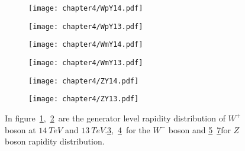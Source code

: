 \documentclass[a4paper,12pt]{report}
\numberwithin{equation}{section}
\begin{document}
\begin{figure}[H]
\centering
\begin{subfigure}{0.49\textwidth}
\texttt{[image: chapter4/WpY14.pdf]}
\vspace*{-8mm}
\caption{}
\label{wpy14}
\end{subfigure}
\begin{subfigure}{0.49\textwidth}
\texttt{[image: chapter4/WpY13.pdf]}
\vspace*{-8mm}
\caption{}
\label{wpy13}
\end{subfigure}
\begin{subfigure}{0.49\textwidth}
\texttt{[image: chapter4/WmY14.pdf]}
\vspace*{-8mm}
\caption{}
\label{wmy14}
\end{subfigure}
\begin{subfigure}{0.49\textwidth}
\texttt{[image: chapter4/WmY13.pdf]}
\vspace*{-8mm}
\caption{}
\label{wmy13}
\end{subfigure}
\begin{subfigure}{0.49\textwidth}
\texttt{[image: chapter4/ZY14.pdf]}
\vspace*{-8mm}
\caption{}
\label{zy14}
\end{subfigure}
\begin{subfigure}{0.49\textwidth}
\texttt{[image: chapter4/ZY13.pdf]}
\vspace*{-8mm}
\caption{}
\label{zy13}
\end{subfigure}
\caption{In figure~\ref{wpy14},~\ref{wpy13}~are the generator level rapidity distribution of $W^{+}$ boson at $14~TeV$ and $13~TeV$.\ref{wmy14},~\ref{wmy13}~for the  $W^{-}$ boson and \ref{zy14}~\ref{zy13}for $Z$ boson rapidity distribution.}  
\end{figure}
\end{document}
